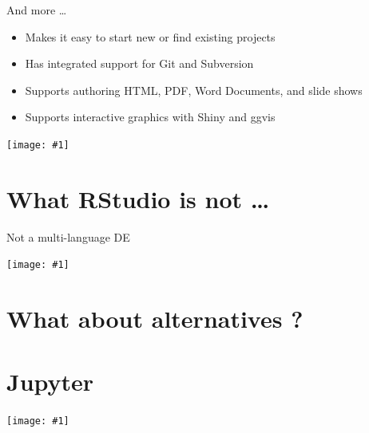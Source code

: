 \documentclass[
  11pt,
  ignorenonframetext,
  aspectratio=169]{beamer}
\providecommand{\tightlist}{%
  \setlength{\itemsep}{0pt}\setlength{\parskip}{0pt}}
\newcommand{\fullframegraphic}[1]{
  \texttt{[image: \#1]}
}
\newlength\beamerleftmargin
\begin{document}
\begin{frame}{And more \ldots{}}
\protect\hypertarget{and-more-1}{}
\begin{itemize}
\tightlist
\item
  Makes it easy to start new or find existing projects
\item
  Has integrated support for Git and Subversion
\item
  Supports authoring HTML, PDF, Word Documents, and slide shows
\item
  Supports interactive graphics with Shiny and ggvis
\end{itemize}
\end{frame}

\begin{frame}{}
\protect\hypertarget{section-4}{}
\vspace*{-10.6mm}\hspace*{-\beamerleftmargin}\hspace*{-1.5mm}
\fullframegraphic{"../captures/Capture d’écran (3)"}
\end{frame}

\hypertarget{what-rstudio-is-not}{%
\section{What RStudio is not \ldots{}}\label{what-rstudio-is-not}}

\begin{frame}{Not a multi-language DE}
\protect\hypertarget{not-a-multi-language-de}{}
\vspace*{-10.6mm}\hspace*{-\beamerleftmargin}\hspace*{-1.5mm}
\fullframegraphic{"../captures/Capture d’écran (12)"}
\end{frame}

\hypertarget{what-about-alternatives}{%
\section{What about alternatives ?}\label{what-about-alternatives}}

\hypertarget{jupyter}{%
\section{Jupyter}\label{jupyter}}

\begin{frame}{}
\protect\hypertarget{section-5}{}
\vspace*{-10.6mm}\hspace*{-\beamerleftmargin}\hspace*{-1.5mm}
\fullframegraphic{"../captures/Capture d’écran (15)"}
\end{frame}
\end{document}
